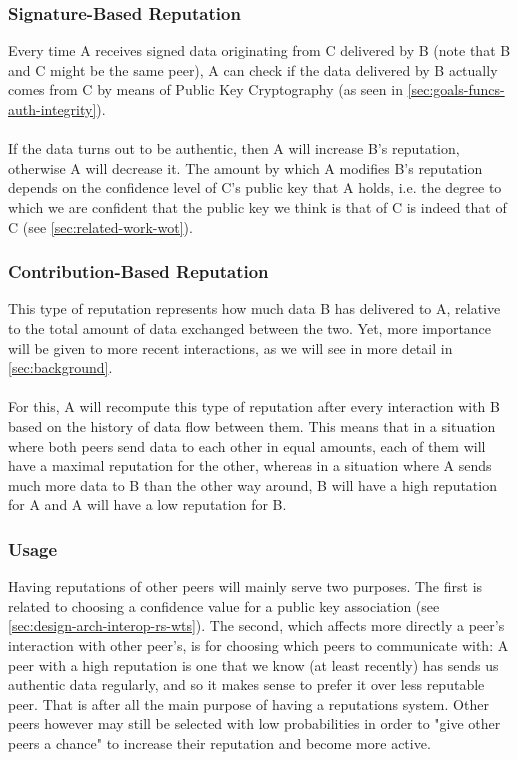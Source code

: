 \documentclass[]{article}
\begin{document}
\subsubsection{Signature-Based Reputation}
\label{sec:sig-based-rep}
Every time A receives signed data originating from C delivered by B (note that B and C might be the same peer), A can check if the data delivered by B actually comes from C by means of Public Key Cryptography (as seen in \ref{sec:goals-funcs-auth-integrity}).
\\\\
If the data turns out to be authentic, then A will increase B's reputation, otherwise A will decrease it.
The amount by which A modifies B's reputation depends on the confidence level of C's public key that A holds, i.e. the degree to which we are confident that the public key we think is that of C is indeed that of C (see \ref{sec:related-work-wot}).

\subsubsection{Contribution-Based Reputation}
This type of reputation represents how much data B has delivered to A, relative to the total amount of data exchanged between the two.
Yet, more importance will be given to more recent interactions, as we will see in more detail in \ref{sec:background}.
\\\\
For this, A will recompute this type of reputation after every interaction with B based on the history of data flow between them.
This means that in a situation where both peers send data to each other in equal amounts, each of them will have a maximal reputation for the other, whereas in a situation where A sends much more data to B than the other way around, B will have a high reputation for A and A will have a low reputation for B.

\subsubsection{Usage}
Having reputations of other peers will mainly serve two purposes.
The first is related to choosing a confidence value for a public key association (see \ref{sec:design-arch-interop-rs-wts}).
The second, which affects more directly a peer's interaction with other peer's, is for choosing which peers to communicate with:
A peer with a high reputation is one that we know (at least recently) has sends us authentic data regularly, and so it makes sense to prefer it over less reputable peer.
That is after all the main purpose of having a reputations system.
Other peers however may still be selected with low probabilities in order to "give other peers a chance" to increase their reputation and become more active.
\end{document}
